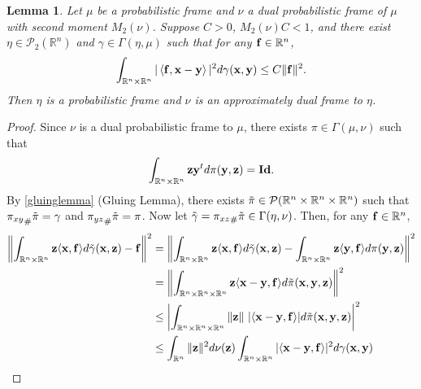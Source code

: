 \documentclass{amsart}
\numberwithin{equation}{section}
\newcommand{\norm}[1]{\left\Vert#1\right\Vert}
\theoremstyle{plain}
\newtheorem{lemma}[theorem]{Lemma}
\theoremstyle{remark}
\theoremstyle{definition}
\begin{document}
\begin{lemma}
Let $\mu$ be a probabilistic frame and $\nu$ a dual probabilistic frame of $\mu$ with second moment $M_2(\nu)$. Suppose $C>0$, $M_2(\nu)  C < 1$, and there exist $\eta \in \mathcal{P}_2(\mathbb{R}^n)$ and $\gamma \in \Gamma(\eta, \mu)$ such that  for any ${\bf f} \in \mathbb{R}^n$,
    \begin{equation*}
  \int_{\mathbb{R}^n \times \mathbb{R}^n}  |\left\langle {\bf f}, {\bf x-y} \right\rangle|^2 d\gamma({\bf x, y}) \leq C    \Vert  {\bf f} \Vert^2. 
    \end{equation*}
Then $\eta$ is a probabilistic frame and $\nu$ is an approximately dual frame to $\eta$. 
\end{lemma}
\begin{proof}
Since $\nu$ is a dual probabilistic frame to $\mu$, there exists $\pi \in \Gamma(\mu, \nu)$ such that
     \begin{equation*}
      \int_{\mathbb{R}^n \times \mathbb{R}^n} {\bf z}{\bf y}^t d\pi({\bf y, z}) = {\bf Id}.
    \end{equation*}
By \cref{gluinglemma} (Gluing Lemma), there exists $\Tilde{\pi} \in \mathcal{P}(\mathbb{R}^n \times \mathbb{R}^n \times \mathbb{R}^n)$ such that ${\pi_{xy}}_{\#}{\Tilde{\pi}} = \gamma$ and ${\pi_{yz}}_{\#}{\Tilde{\pi}}=\pi$. Now let $\Tilde{\gamma} = {\pi_{xz}}_{\#}{\Tilde{\pi}} \in \Gamma(\eta, \nu)$.
Then, for any ${\bf f} \in \mathbb{R}^n$, 
 \begin{equation*}
 \begin{split}
     \norm{ \int_{\mathbb{R}^n \times \mathbb{R}^n} {\bf z} \langle {\bf x}, {\bf f} \rangle d\Tilde{\gamma}({\bf x, z}) - {\bf f}}^2
      &=  \norm{ \int_{\mathbb{R}^n \times \mathbb{R}^n} {\bf z} \langle {\bf x}, {\bf f} \rangle d\Tilde{\gamma}({\bf x, z}) - \int_{\mathbb{R}^n \times \mathbb{R}^n} {\bf z}\langle {\bf y}, {\bf f} \rangle  d\pi({\bf y, z}) }^2 \\
      &= \norm{\int_{\mathbb{R}^n \times \mathbb{R}^n \times \mathbb{R}^n} {\bf z} \langle {\bf x-y}, {\bf f} \rangle  d\Tilde{\pi}({\bf x, y, z}) }^2 \\
      & \leq \left | \int_{\mathbb{R}^n \times \mathbb{R}^n \times \mathbb{R}^n}  \| {\bf z} \| \ |\langle {\bf x-y}, {\bf f} \rangle |  d\Tilde{\pi}({\bf x, y, z}) \right |^2 \\
      & \leq  \int_{\mathbb{R}^n} \| {\bf z} \|^2   d\nu({\bf z})   \int_{\mathbb{R}^n \times \mathbb{R}^n} |\langle {\bf x-y}, {\bf f} \rangle |^2  d\gamma({\bf x, y}) \\

\end{split}
\end{equation*}
\end{proof}
\end{document}
